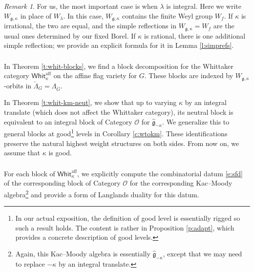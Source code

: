 \documentclass[11pt,reqno]{amsart}
\newcommand{\aff}{\operatorname{aff}}
\newcommand{\fg}{\mathfrak{g}}
\newcommand{\OO}{\mathscr{O}}
\theoremstyle{remark}
\newtheorem{re}[subsubsection]{Remark}
\numberwithin{equation}{section}
\newcommand{\Whit}{\mathsf{Whit}}
\begin{document}
\begin{re}

For us, the most important case is when $\lambda$ is integral. 
Here we write $W_{\fg,\kappa}$
in place of $W_{\lambda}$. 
In this case, $W_{\fg,\kappa}$ contains
the finite Weyl group $W_f$. 
If $\kappa$ is irrational, the two are equal, and 
the simple reflections in $W_{\fg,\kappa} = W_f$ 
are the usual ones determined by our fixed Borel.
If $\kappa$ is rational, there is one additional simple reflection;
we provide an explicit formula for it in 
Lemma \ref{l:simprefs}.

\end{re}

\subsubsection{}

In Theorem \ref{t:whit-blocks}, we find a block decomposition 
for the Whittaker category $\Whit_{\kappa}^{\aff}$ %
on the affine flag variety for $G$.
These blocks are indexed by $W_{\fg,\kappa}$-orbits in 
$\check{\Lambda}_G = \Lambda_{\check{G}}$. 

In Theorem \ref{t:whit-km-neut}, we show that up to varying
$\kappa$ by an integral translate (which does not affect the Whittaker
category), its neutral block is equivalent to an integral block of
Category $\OO$ for $\widehat{\fg}_{-\kappa}$. 
We generalize this to general blocks at good\footnote{In our actual exposition, 
the definition of good level is essentially rigged so such a result holds. 
The content is rather in Proposition \ref{p:adapt}, which provides a concrete 
description of good levels.} 
levels in Corollary \ref{c:wtokm}. These identifications preserve
the natural highest weight structures on both sides. From now on, we assume 
that $\kappa$ is good.

\subsubsection{}

For each block of $\Whit_{\kappa}^{\aff}$, we explicitly compute
the combinatorial datum \eqref{e:sfd} of the corresponding block of 
Category $\OO$ for the corresponding Kac--Moody 
algebra\footnote{Again,
this Kac--Moody algebra is essentially $\widehat{\fg}_{-\kappa}$, 
except that we may need to replace $-\kappa$ by an integral translate.}
and provide a form of Langlands duality for this datum. 
\end{document}
